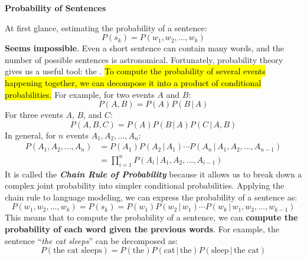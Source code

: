 \highspace
\begin{flushleft}
    \textcolor{Green3}{ \textbf{Probability of Sentences}}
\end{flushleft}
At first glance, estimating the probability of a sentence:
\begin{equation*}
    P(s_k) = P\left(w_1, w_2, \dots, w_k\right)
\end{equation*}
\textbf{Seems impossible}. Even a short sentence can contain many words, and the number of possible sentences is astronomical. Fortunately, probability theory gives us a useful tool: the . \hl{To compute the probability of several events happening together, we can decompose it into a product of conditional probabilities.} For example, for two events $A$ and $B$:
\begin{equation*}
    P\left(A,B\right) = P\left(A\right) P\left(B \, | \, A\right)
\end{equation*}
For three events $A$, $B$, and $C$:
\begin{equation*}
    P\left(A,B,C\right) = P\left(A\right) P\left(B \, | \, A\right) P\left(C \, | \, A, B\right)
\end{equation*}
In general, for $n$ events $A_1, A_2, \dots, A_n$:
\begin{equation}\label{eq:chain-rule-of-probability}
    \begin{aligned}
        P\left(A_1, A_2, \dots, A_n\right) &= P\left(A_1\right) P\left(A_2 \, | \, A_1\right) \cdots P\left(A_n \, | \, A_1, A_2, \dots, A_{n-1}\right) \\
        &= \prod_{i=1}^n P\left(A_i \, | \, A_1, A_2, \dots, A_{i-1}\right)
    \end{aligned}
\end{equation}
It is called the \textbf{\emph{Chain Rule of Probability}} because it allows us to break down a complex joint probability into simpler conditional probabilities. Applying the chain rule to language modeling, we can express the probability of a sentence as:
\begin{equation*}
    P\left(w_1, w_2, \dots, w_k\right) = P\left(s_k\right) = P\left(w_1\right) P\left(w_2 \, | \, w_1\right) \cdots P\left(w_k \, | \, w_1, w_2, \dots, w_{k-1}\right)
\end{equation*}
This means that to compute the probability of a sentence, we can \textbf{compute the probability of each word given the previous words}. For example, the sentence ``\emph{the cat sleeps}'' can be decomposed as:
\begin{equation*}
    P\left(\text{the cat sleeps}\right) = P\left(\text{the}\right) P\left(\text{cat} \, | \, \text{the}\right) P\left(\text{sleep} \, | \, \text{the cat}\right)
\end{equation*}

